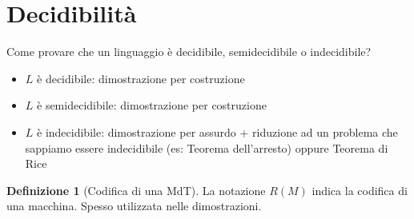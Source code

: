 \documentclass{article}  %
\theoremstyle{definition}
\newtheorem{definition}{Definizione}[section]
\begin{document}
\section{Decidibilità}
\newline \newline
Come provare che un linguaggio è decidibile, semidecidibile o indecidibile?
\begin{itemize}
	\item $L$ è decidibile: dimostrazione per costruzione
	\item $L$ è semidecidibile: dimostrazione per costruzione
	\item $L$ è indecidibile: dimostrazione per assurdo + riduzione ad un problema che sappiamo essere indecidibile (es: Teorema dell'arresto) oppure Teorema di Rice
\end{itemize}
\begin{definition}[Codifica di una MdT] La notazione $R(M)$ indica la codifica di una macchina. Spesso utilizzata nelle dimostrazioni.
\end{definition}
\end{document}
